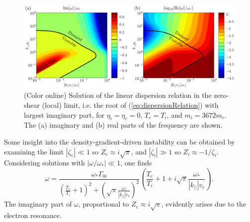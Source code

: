 \documentclass[12pt,superscriptaddress]{revtex4}
\begin{document}
\begin{figure}[h!]
\includegraphics[width=6in]{m20141214_01_plotUniversalModeDispersionRelationForPaper.pdf}
\caption{(Color online) Solution of the linear dispersion relation in the zero-shear (local) limit, i.e. the
root of (\ref{eq:dispersionRelation}) with largest imaginary part, for $\eta_i = \eta_e = 0$,
$T_e = T_i$, and $m_i = 3672 m_e$.
The (a) imaginary and (b)
real parts of the frequency are shown.
\label{fig:localDispersionRelation}}
\end{figure}

Some insight into the density-gradient-driven instability can be obtained by
examining the limit $|\zeta_e| \ll 1$ so $Z_e \approx i\sqrt{\pi}$,
and $|\zeta_i| \gg 1$ so $Z_i \approx -1/\zeta_i$. Considering solutions with $|\omega/\omega_*| \ll 1$,
one finds
\begin{equation}
\label{eq:approxRoot}
\omega = \frac{\omega_* \Gamma_{0i}}
{\left(\frac{T_e}{T_i}+1\right)^2 + \left(\sqrt{\pi}\frac{\omega_*}{|k_{||}| v_e}\right)^2}
\left( \frac{T_e}{T_i} + 1 + i \sqrt{\pi}\frac{\omega_*}{|k_{||}| v_e}\right).
\end{equation}
The imaginary part of $\omega$, proportional to  $Z_e \approx i\sqrt{\pi}$, evidently arises due to the electron resonance.


\end{document}
